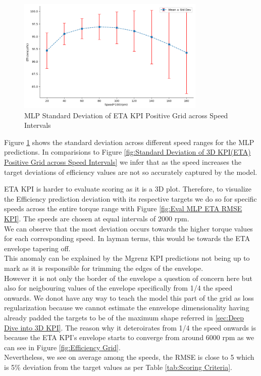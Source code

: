 \documentclass{report} %
\begin{document}
\begin{figure}[H]
    \centering
    \includegraphics[width=0.8\textwidth]{./ReportImages/stddev_y2_nn_MLP.png} 
    \caption{\ac{MLP} Standard Deviation of ETA \ac{KPI} Positive Grid across Speed Intervals} 
    \label{fig:MLP Standard Deviation of 3D KPI(ETA) Positive Grid across Speed Intervals}
\end{figure}

Figure \ref{fig:MLP Standard Deviation of 3D KPI(ETA) Positive Grid across Speed Intervals} shows the standard deviation across different speed ranges for the \ac{MLP} predictions.
In comparisions to Figure \ref{fig:Standard Deviation of 3D KPI(ETA) Positive Grid across Speed Intervals} we infer that as the speed increases the target deviations of efficiency values are not so accurately captured by the model.

ETA \ac{KPI} is harder to evaluate scoring as it is a \ac{3D} plot. 
Therefore, to visualize the Efficiency prediction deviation with its respective targets we do so for specific speeds across the entire torque range with Figure \ref{fig:Eval MLP ETA RMSE KPI}.
The speeds are chosen at equal intervals of 2000 rpm.\\
We can observe that the most deviation occurs towards the higher torque values for each corresponding speed. In layman terms, this would be towards the ETA envelope tapering off.\\
This anomaly can be explained by the Mgrenz \ac{KPI} predictions not being up to mark as it is responsible for trimming the edges of the envelope.\\
However it is not only the border of the envelope a question of concern here but also for neigbouring values of the envelope specifically from 1/4 the speed onwards. 
We donot have any way to teach the model this part of the grid as loss regularization because we cannot estimate the ennvelope dimensionality having already padded the targets to be of the maximum shape referred in \ref{sec:Deep Dive into 3D KPI}.
The reason why it deteroirates from 1/4 the speed onwards is because the ETA \ac{KPI}'s envelope starts to converge from around 6000 rpm as we can see in Figure \ref{fig:Efficiency Grid}.\\
Nevertheless, we see on average among the speeds, the \ac{RMSE} is close to 5 which is 5\% deviation from the target values as per Table \ref{tab:Scoring Criteria}.\\
\end{document}
